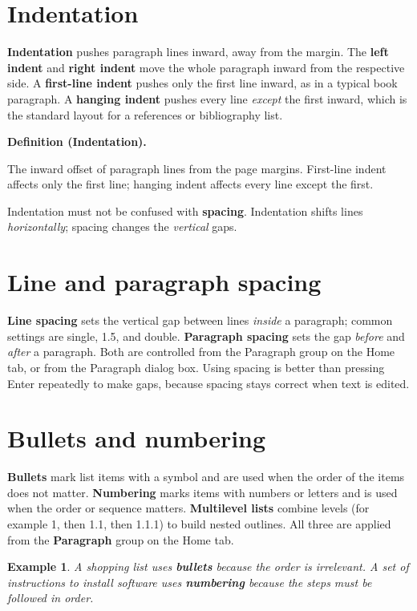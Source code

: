 \documentclass[11pt]{article}
\newtheorem{example}{Example}[section]
\newenvironment{definitionbox}[1]{%
  \par\noindent\textbf{Definition (#1).}\ \itshape
}{\par\vspace{0.3em}}
\begin{document}
\section{Indentation}
\textbf{Indentation} pushes paragraph lines inward, away from the margin.
The \textbf{left indent} and \textbf{right indent} move the whole paragraph
inward from the respective side. A \textbf{first-line indent} pushes only
the first line inward, as in a typical book paragraph. A \textbf{hanging
indent} pushes every line \emph{except} the first inward, which is the
standard layout for a references or bibliography list.

\begin{definitionbox}{Indentation}
The inward offset of paragraph lines from the page margins. First-line
indent affects only the first line; hanging indent affects every line except
the first.
\end{definitionbox}

Indentation must not be confused with \textbf{spacing}. Indentation shifts
lines \emph{horizontally}; spacing changes the \emph{vertical} gaps.

\section{Line and paragraph spacing}
\textbf{Line spacing} sets the vertical gap between lines \emph{inside} a
paragraph; common settings are single, 1.5, and double. \textbf{Paragraph
spacing} sets the gap \emph{before} and \emph{after} a paragraph. Both are
controlled from the Paragraph group on the Home tab, or from the Paragraph
dialog box. Using spacing is better than pressing Enter repeatedly to make
gaps, because spacing stays correct when text is edited.

\section{Bullets and numbering}
\textbf{Bullets} mark list items with a symbol and are used when the order of
the items does not matter. \textbf{Numbering} marks items with numbers or
letters and is used when the order or sequence matters. \textbf{Multilevel
lists} combine levels (for example 1, then 1.1, then 1.1.1) to build nested
outlines. All three are applied from the \textbf{Paragraph} group on the
Home tab.

\begin{example}
A shopping list uses \textbf{bullets} because the order is irrelevant. A set
of instructions to install software uses \textbf{numbering} because the
steps must be followed in order.
\end{example}
\end{document}
